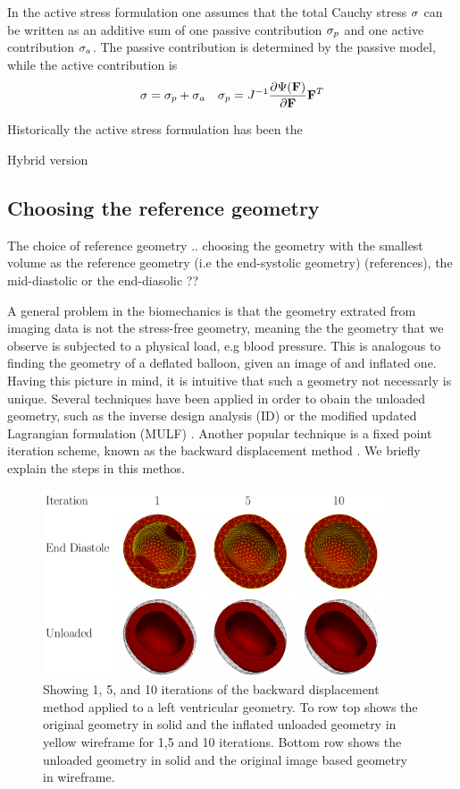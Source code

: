 In the active stress formulation \cite{hunter1998modelling} one assumes
that the total Cauchy stress $\mathbf{\sigma}$ can be written as an additive sum of one
passive contribution $\mathbf{\sigma}_p$ and one active contribution
$\mathbf{\sigma}_a$. The passive contribution is determined by the passive
model, while the active contribution is 
\begin{align}
  \mathbf{\sigma} = \mathbf{\sigma}_p + \mathbf{\sigma}_a && \mathbf{\sigma}_p = J^{-1} \frac{\partial \Psi(\mathbf{F})}{\partial \mathbf{F}} \mathbf{F}^{T}
\end{align}


Historically the active stress formulation has been the


Hybrid version \cite{goktepe2014generalized}

\subsection{Choosing the reference geometry}
\label{sef:reference_geometry}
The choice of reference geometry ..
 choosing the geometry with the smallest
volume as the reference geometry (i.e the end-systolic geometry)
(references), the mid-diastolic or the end-diasolic ??


A general problem in the biomechanics is that the geometry extrated from
imaging data is not the stress-free geometry, meaning the the geometry
that we observe is subjected to a physical load, e.g blood pressure.
This is analogous to finding the geometry of a deflated balloon, given
an image of and inflated one. Having this picture in mind, it is
intuitive that such a geometry not necessarly is unique.
Several techniques have been applied in order to obain the unloaded
geometry, such as the inverse design analysis (ID)
\cite{govindjee1996computational} or the modified updated Lagrangian
formulation (MULF) \cite{gee2010computational}. Another popular
technique is a fixed point iteration scheme,  known as the
backward displacement method \cite{bols2013computational}. We briefly
explain the steps in this methos.

\begin{figure}[htbp]
  \centering
    \includegraphics[width=0.9\textwidth]{chapters/introduction/figures/unloading/canvas.pdf}
\caption{Showing 1, 5, and 10 iterations of the backward displacement
  method applied to a left ventricular geometry. To row top shows the
  original geometry in solid and the inflated unloaded geometry in
  yellow wireframe for 1,5 and 10 iterations. Bottom row shows the
  unloaded geometry in solid and the original image based geometry in wireframe.}
\label{fig:unloading_lv}
\end{figure}


